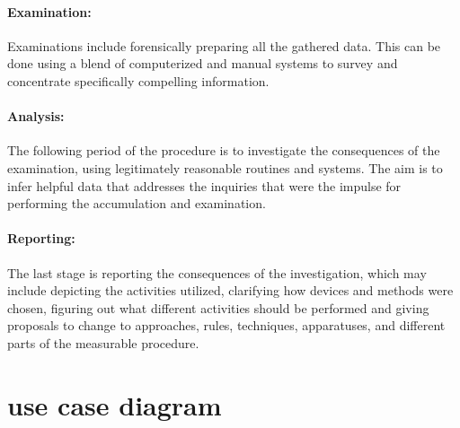 \paragraph{Examination:}
Examinations include forensically preparing all the gathered data. This can be done using a blend of computerized and manual systems to survey and concentrate specifically compelling information. 

\paragraph{Analysis:}
The following period of the procedure is to investigate the consequences of the examination, using legitimately reasonable routines and systems. The aim is to infer helpful data that addresses the inquiries that were the impulse for performing the accumulation and examination. 


\paragraph{Reporting:}
The last stage is reporting the consequences of the investigation, which may include depicting the activities utilized, clarifying how devices and methods were chosen, figuring out what different activities should be performed and giving proposals to change to approaches, rules, techniques, apparatuses, and different parts of the measurable procedure. 








\section{use case diagram}


\sediva{ \blindtext}

